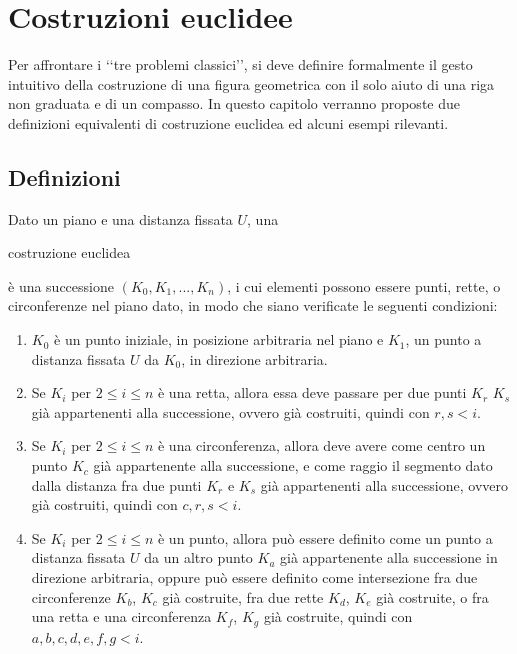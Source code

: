 
\chapter{Costruzioni euclidee}

Per affrontare i \lq\lq tre problemi classici\rq\rq, si deve definire formalmente il gesto intuitivo della costruzione di una figura geometrica con il solo aiuto di una riga non graduata e di un compasso. In questo capitolo verranno proposte due definizioni equivalenti di costruzione euclidea ed alcuni esempi rilevanti.

\section{Definizioni}

\begin{definizione} 
Dato un piano e una distanza fissata $U$, una \begin{bfseries}costruzione euclidea\end{bfseries} è una successione $(K_{0}, K_{1},..., K_{n})$, i cui elementi possono essere punti, rette, o circonferenze nel piano dato, in modo che siano verificate le seguenti condizioni:

\begin{enumerate}

\item $K_{0}$ è un punto iniziale, in posizione arbitraria nel piano e $K_{1}$, un punto a distanza fissata $U$ da $K_{0}$, in direzione arbitraria.

\item Se $K_{i}$ per $ 2 \le i \le n$ è una retta, allora essa deve passare per due punti $K_{r}$ $K_{s}$ già appartenenti alla successione, ovvero già costruiti, quindi con $r, s < i$.

\item Se $K_{i}$ per $ 2 \le i \le n$ è una circonferenza, allora deve avere come centro un punto $K_{c}$ già appartenente alla successione, e come raggio il segmento dato dalla distanza fra due punti $K_{r}$ e $K_{s}$ già appartenenti alla successione, ovvero già costruiti, quindi con $c, r, s < i$.

\item Se $K_{i}$ per $ 2 \le i \le n$ è un punto, allora può essere definito come un punto a distanza fissata $U$ da un altro punto $K_{a}$ già appartenente alla successione in direzione arbitraria, oppure può essere definito come intersezione fra due circonferenze $K_{b}$, $K_{c}$  già costruite, fra due rette $K_{d}$, $K_{e}$ già costruite, o fra una retta e una circonferenza $K_{f}$, $K_{g}$ già costruite, quindi con $a,b,c,d,e,f,g < i$. 
\end{enumerate}
\end{definizione}

